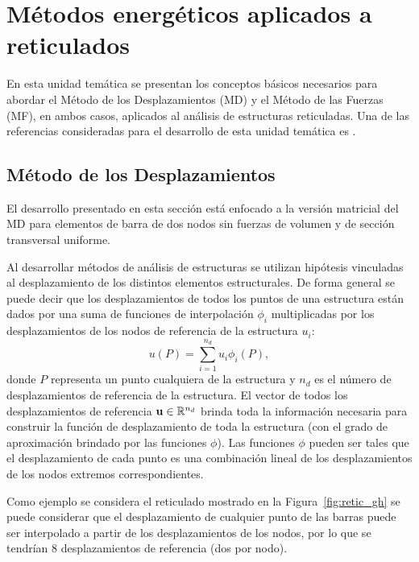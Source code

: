 
\chapter[Métodos energéticos aplicados a reticulados]{Métodos energéticos aplicados a reticulados}

En esta unidad temática se presentan los conceptos básicos necesarios para abordar el Método de los Desplazamientos (MD) y el Método de las Fuerzas (MF), en ambos casos, aplicados al análisis de estructuras reticuladas. %
%
Una de las referencias consideradas para el desarrollo de esta unidad temática es \citep{Reddy2002b}. %



\section{Método de los Desplazamientos}

El desarrollo presentado en esta sección está enfocado a la versión matricial del MD para elementos de barra de dos nodos sin fuerzas de volumen y de sección transversal uniforme. %
%

Al desarrollar métodos de análisis de estructuras se utilizan hipótesis vinculadas al desplazamiento de los distintos elementos estructurales. %
De forma general se puede decir que los desplazamientos de todos los puntos de una estructura están dados por una suma de funciones de interpolación $\phi_i$ multiplicadas por los desplazamientos de los nodos de referencia de la estructura $u_i$:
%
\begin{equation}
u(P) = \sum_{i=1}^{n_d} u_i \phi_i(P),
\end{equation}
%
donde $P$ representa un punto cualquiera de la estructura y $n_d$ es el número de desplazamientos de referencia de la estructura. %
%
El vector de todos los desplazamientos de referencia ${\bf u} \in {\mathbb R}^{n_d}$ brinda toda la información necesaria para construir la función de desplazamiento de toda la estructura (con el grado de aproximación brindado por las funciones $\phi$). %
%
Las funciones $\phi$ pueden ser tales que el desplazamiento de cada punto es una combinación lineal de los desplazamientos de los nodos extremos correspondientes.

Como ejemplo se considera el reticulado mostrado en la Figura~\ref{fig:retic_gh} se puede considerar que el desplazamiento de cualquier punto de las barras puede ser interpolado a partir de los desplazamientos de los nodos, por lo que se tendrían $8$ desplazamientos de referencia (dos por nodo).

